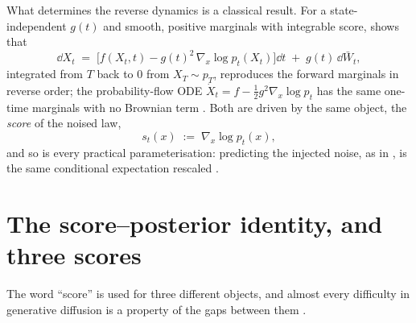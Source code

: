 What determines the reverse dynamics is a classical result. For a
state-independent $g(t)$ and smooth, positive marginals with integrable score,
\citet{anderson1982reverse} shows that
\begin{equation}
  \dd X_t
  \;=\;
  \big[ f(X_t,t) - g(t)^2\,\nabla_x\log p_t(X_t) \big]\dd t
  \;+\; g(t)\,\dd\bar W_t ,
  \label{eq:sm-reverse}
\end{equation}
integrated from $T$ back to $0$ from $X_T \sim p_T$, reproduces the forward
marginals in reverse order; the probability-flow ODE
$\dot X_t = f - \tfrac12 g^2 \nabla_x \log p_t$ has the same one-time
marginals with no Brownian term \citep{song2021scorebased}. Both are driven
by the same object, the \emph{score} of the noised law,
\begin{equation}
  s_t(x) \;:=\; \nabla_x \log p_t(x),
  \label{eq:intro-score}
\end{equation}
and so is every practical parameterisation: predicting the injected noise, as
in \citet{ho2020denoising}, is the same conditional expectation rescaled
\citep{lai2025principles}.

\section{The score--posterior identity, and three scores}
\label{sec:sm-three-scores}\label{sec:tweedie}

The word ``score'' is used for three different objects, and almost every
difficulty in generative diffusion is a property of the gaps between them
\citep{biroli2023generative}.

